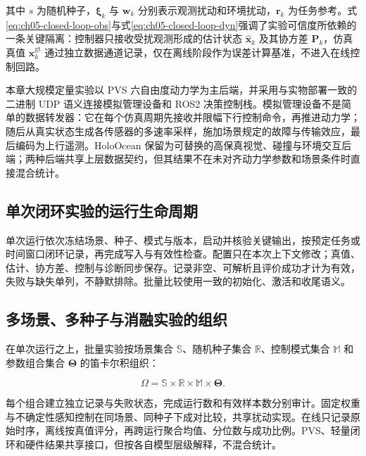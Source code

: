 其中 \(s\) 为随机种子，\(\boldsymbol{\xi}_k\) 与 \(\boldsymbol{w}_k\) 分别表示观测扰动和环境扰动，\(\boldsymbol{r}_k\) 为任务参考。式\eqref{eq:ch05-closed-loop-obs}与式\eqref{eq:ch05-closed-loop-dyn}强调了实验可信度所依赖的一条关键隔离：控制器只接收受扰观测形成的估计状态 \(\hat{\boldsymbol{x}}_k\) 及其协方差 \(\boldsymbol{P}_k\)，仿真真值 \(\boldsymbol{x}^{\mathrm{gt}}_k\) 通过独立数据通道记录，仅在离线阶段作为误差计算基准，不进入在线控制回路。

本章大规模定量实验以 PVS 六自由度动力学为主后端，并采用与实物部署一致的二进制 UDP 语义连接模拟管理设备和 ROS2 决策控制栈。模拟管理设备不是简单的数据转发器：它在每个仿真周期先接收并限幅下行控制命令，再推进动力学；随后从真实状态生成各传感器的多速率采样，施加场景规定的故障与传输效应，最后编码为上行遥测。HoloOcean 保留为可替换的高保真视觉、碰撞与环境交互后端；两种后端共享上层数据契约，但其结果不在未对齐动力学参数和场景条件时直接混合统计。

\subsection{单次闭环实验的运行生命周期}\label{sec:ch05-5-1-2}

单次运行依次冻结场景、种子、模式与版本，启动并核验关键输出，按预定任务或时间窗口闭环记录，再完成写入与有效性检查。配置只在本次上下文修改；真值、估计、协方差、控制与诊断同步保存。记录非空、可解析且评价成功才计为有效，失败与缺失单列，不静默排除。批量比较使用一致的初始化、激活和收尾语义。

\subsection{多场景、多种子与消融实验的组织}\label{sec:ch05-5-1-3}

在单次运行之上，批量实验按场景集合 \(\mathbb{S}\)、随机种子集合 \(\mathbb{R}\)、控制模式集合 \(\mathbb{M}\) 和参数组合集合 \(\boldsymbol{\Theta}\) 的笛卡尔积组织：

\begin{equation}
\Omega
=
\mathbb{S}\times\mathbb{R}\times\mathbb{M}\times\boldsymbol{\Theta}.
\label{eq:ch05-experiment-space}
\end{equation}

每个组合建立独立记录与失败状态，完成运行数和有效样本数分别审计。固定权重与不确定性感知控制在同场景、同种子下成对比较，共享扰动实现。在线只记录原始时序，离线按真值评分，再跨运行聚合均值、分位数与成功比例。PVS、轻量闭环和硬件结果共享接口，但按各自模型层级解释，不混合统计。

